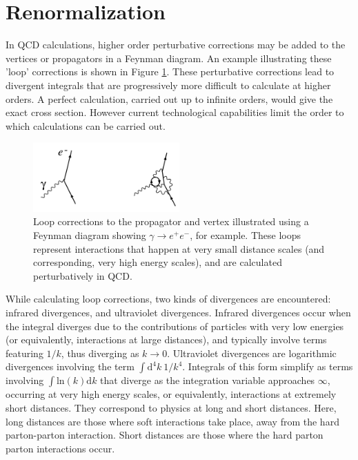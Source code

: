 \documentclass[12pt,a4paper,openright,twoside]{report}
\begin{document}
\section{Renormalization}\label{sec:renorm}
In QCD calculations, higher order perturbative corrections may be added to the vertices or propagators in a Feynman diagram. An example illustrating these 'loop' corrections is shown in Figure \ref{fig:loop_corr}. These perturbative corrections lead to divergent integrals that are progressively more difficult to calculate at higher orders. A perfect calculation, carried out up to infinite orders, would give the exact cross section. However current technological capabilities limit the order to which calculations can be carried out.

\begin{figure}[H]
\centering
\includegraphics[width=0.5\textwidth]{renormalize_diagram.png}
\caption{Loop corrections to the propagator and vertex illustrated using a Feynman diagram showing $\gamma\to e^+e^-$, for example. These loops represent interactions that happen at very small distance scales (and corresponding, very high energy scales), and are calculated perturbatively in QCD.}
\label{fig:loop_corr}
\end{figure}

While calculating loop corrections, two kinds of divergences are encountered: infrared divergences, and ultraviolet divergences. Infrared divergences occur when the integral diverges due to the contributions of particles with very low energies (or equivalently, interactions at large distances), and typically involve terms featuring $1/k$, thus diverging as $k\to 0$. Ultraviolet divergences are logarithmic divergences involving the term $\int \mathrm{d}^4k\ 1/k^4$. Integrals of this form simplify as terms involving $\int \mathrm{ln}(k) \mathrm{d}k$ that diverge as the integration variable approaches $\infty$, occurring at very high energy scales, or equivalently, interactions at extremely short distances. They correspond to physics at long and short distances. Here, long distances are those where soft interactions take place, away from the hard parton-parton interaction. Short distances are those where the hard parton parton interactions occur.
\end{document}
